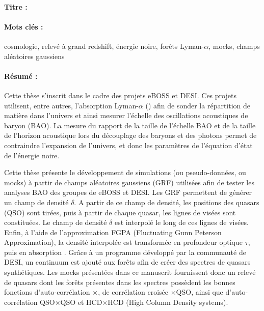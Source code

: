 \begin{mdframed}[linecolor=Prune,linewidth=1]
\vspace{-.25cm}
\paragraph*{Titre :} \PhDTitle{}

\begin{small}
\vspace{-.25cm}
\paragraph*{Mots clés :} cosmologie, relevé à grand redshift, énergie noire, forêts Lyman-$\alpha$, mocks, champs aléatoires gaussiens

\vspace{-.5cm}
\begin{multicols}{2}
  \paragraph*{Résumé :}
  Cette thèse s'inscrit dans le cadre des projets eBOSS et DESI.
  Ces projets utilisent, entre autres, l'absorption Lyman-$\alpha$ (\lya) afin de sonder la répartition de matière dans l'univers et ainsi mesurer l'échelle des oscillations acoustiques de baryon (BAO).
  La mesure du rapport de la taille de l'échelle BAO et de la taille de l'horizon acoustique lors du découplage des baryons et des photons permet de contraindre l'expansion de l'univers,
  et donc les paramètres de l'équation d'état de l'énergie noire.

  Cette thèse présente le développement de simulations (ou pseudo-données, ou mocks) à partir de champs aléatoires gaussiens (GRF) utilisées afin de tester les analyses BAO des groupes \lya{} de eBOSS et DESI.
  Les GRF permettent de générer un champ de densité $\delta$.
  A partir de ce champ de densité, les positions des quasars (QSO) sont tirées, puis à partir de chaque quasar, les lignes de visées sont constituées.
  Le champ de densité $\delta$ est interpolé le long de ces lignes de visées.
  Enfin, à l'aide de l'approximation FGPA (Fluctuating Gunn Peterson Approximation), la densité interpolée est transformée en profondeur optique $\tau$, puis en absorption \lya{}.
  Grâce à un programme développé par la communauté de DESI, un continuum est ajouté aux forêts \lya{} afin de créer des spectres de quasars synthétiques.
  Les mocks présentées dans ce manuscrit fournissent donc un relevé de quasars dont les forêts \lya{} présentes dans les spectres possèdent les bonnes fonctions d'auto-corrélation \lya{}$\times$\lya{}, de corrélation croisée \lya{}$\times$QSO, ainsi que d'auto-corrélation QSO$\times$QSO et HCD$\times$HCD (High Column Density systems).


\end{multicols}
\end{small}
\end{mdframed}
